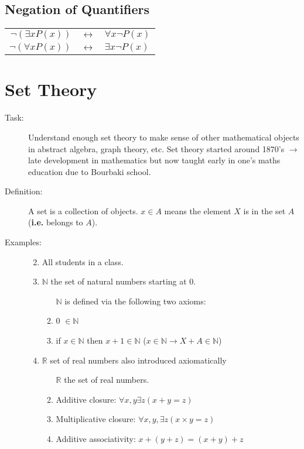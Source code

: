 \documentclass[10pt]{article}
\begin{document}
	\subsection{Negation of Quantifiers}
	\begin{tabular}{rcl}
		$\lnot(\exists xP(x))$ & $\leftrightarrow$ & $\forall x\lnot P(x)$ \\
		$\lnot(\forall xP(x))$ & $\leftrightarrow$ & $\exists x\lnot P(x)$ \\
	\end{tabular}
	
	\section{Set Theory}
	\begin{description}
		\item[Task:] Understand enough set theory to make sense of other mathematical objects in abstract algebra, graph theory, etc. Set theory started around 1870's $\rightarrow$ late development in mathematics but now taught early in one's maths education due to Bourbaki school.
		\item[Definition:] A set is a collection of objects. $x\in A$ means the element $X$ is in the set $A$ (\textbf{i.e.} belongs to $A$).
		\item[Examples:] 
		\begin{enumerate}
			\item[]
			\item All students in a class.
			\item $\mathbb{N}$ the set of natural numbers starting at 0.
			\begin{enumerate}
				\item [$\mathbb{N}$] is defined via the following two axioms:
				\item 0 $\in \mathbb{N}$
				\item if $x \in \mathbb{N}$ then $x+1 \in \mathbb{N}$ ($x \in \mathbb{N} \rightarrow X+A \in \mathbb{N}$)
			\end{enumerate}
			\item $\mathbb{R}$ set of real numbers also introduced axiomatically
			\begin{enumerate}
				\item[$\mathbb{R}$] the set of real numbers.
				\item Additive closure: $\forall x, y \exists z (x+y=z)$
				\item Multiplicative closure: $\forall x, y, \exists z (x \times y=z)$
				\item Additive associativity: $x+(y+z)=(x+y)+z$

\end{enumerate}
\end{enumerate}
\end{description}
\end{document}
